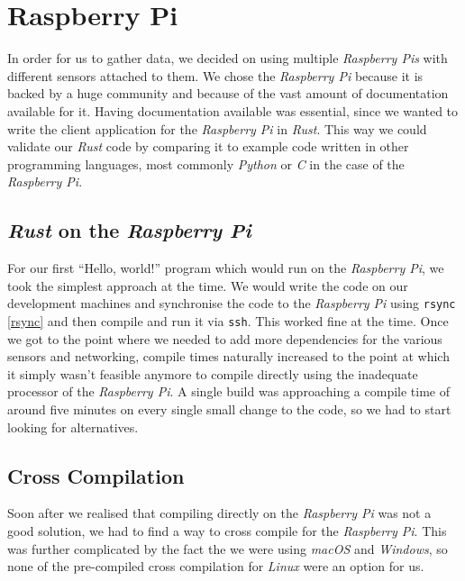 \section{Raspberry Pi}

In order for us to gather data, we decided on using multiple \textit{Raspberry Pis} with different
sensors attached to them. We chose the \textit{Raspberry Pi} because it is backed by a huge
community and because of the vast amount of documentation available for it. Having documentation
available was essential, since we wanted to write the client application for the \textit{Raspberry
Pi} in \textit{Rust}. This way we could validate our \textit{Rust} code by comparing it to example
code written in other programming languages, most commonly \textit{Python} or \textit{C} in the case
of the \textit{Raspberry Pi}.

\subsection{\textit{Rust} on the \textit{Raspberry Pi}}

For our first “Hello, world!” program which would run on the \textit{Raspberry Pi}, we took the
simplest approach at the time. We would write the code on our development machines and synchronise
the code to the \textit{Raspberry Pi} using \texttt{rsync} \ref{rsync} and then compile and run it
via \texttt{ssh}. This worked fine at the time. Once we got to the point where we needed to add more
dependencies for the various sensors and networking, compile times naturally increased to the point
at which it simply wasn't feasible anymore to compile directly using the inadequate processor of the
\textit{Raspberry Pi}. A single build was approaching a compile time of around five minutes on every
single small change to the code, so we had to start looking for alternatives.

\subsection{Cross Compilation}

Soon after we realised that compiling directly on the \textit{Raspberry Pi} was not a good solution,
we had to find a way to cross compile for the \textit{Raspberry Pi}. This was further complicated by
the fact the we were using \textit{macOS} and \textit{Windows}, so none of the pre-compiled cross
compilation  for \textit{Linux} were an option for us.

